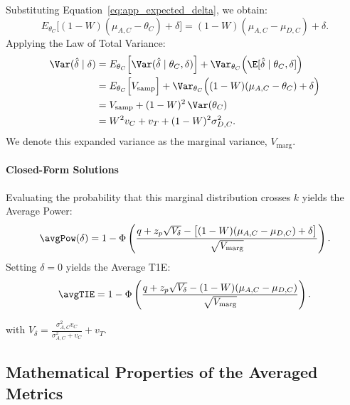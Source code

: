 Substituting Equation~\eqref{eq:app_expected_delta}, we obtain:
\begin{equation} \label{eq:app_marginal_expectation}
    E_{\theta_C} \Big[ (1 - W)(\mu_{A,C} - \theta_C) + \delta \Big] = (1 - W)(\mu_{A,C} - \mu_{D,C}) + \delta. 
\end{equation}
Applying the Law of Total Variance:
\begin{align}
\Var(\hat{\delta} \mid \delta) &= E_{\theta_C} \Big[ \Var(\hat{\delta} \mid \theta_C, \delta) \Big] + \Var_{\theta_C} \Big( \E[\hat{\delta} \mid \theta_C, \delta] \Big) \nonumber \\
&= E_{\theta_C} \Big[ V_{\text{samp}} \Big] + \Var_{\theta_C} \Big( (1 - W)(\mu_{A,C} - \theta_C) + \delta \Big) \nonumber \\
&= V_{\text{samp}} + (1 - W)^2 \, \Var(\theta_C) \nonumber \\
&= W^2 v_C + v_T + (1 - W)^2 \sigma_{D,C}^2. \label{eq:app_marginal_variance}
\end{align}
We denote this expanded variance as the marginal variance, $V_{\text{marg}}$. 

\paragraph{Closed-Form Solutions}
Evaluating the probability that this marginal distribution crosses $k$ yields the Average Power:
\begin{equation} \label{eq:app_avgpower_closed_form}
    \avgPow(\delta) = 1 - \Phi\left( \frac{q + z_p \sqrt{V_{\delta}} - \big[(1 - W)(\mu_{A,C} - \mu_{D,C}) + \delta\big]}{\sqrt{V_{\text{marg}}}} \right).
\end{equation}
Setting $\delta = 0$ yields the Average T1E: 
\begin{equation} \label{eq:app_avgt1e_closed_form}
    \avgTIE = 1 - \Phi\left( \frac{q + z_p \sqrt{V_{\delta}} - (1 - W)(\mu_{A,C} - \mu_{D,C})}{\sqrt{V_{\text{marg}}}} \right).
\end{equation}

with $V_{\delta} = \frac{\sigma_{A,C}^2 v_C}{\sigma_{A,C}^2 + v_C} + v_T$.

\subsection{Mathematical Properties of the Averaged Metrics}

